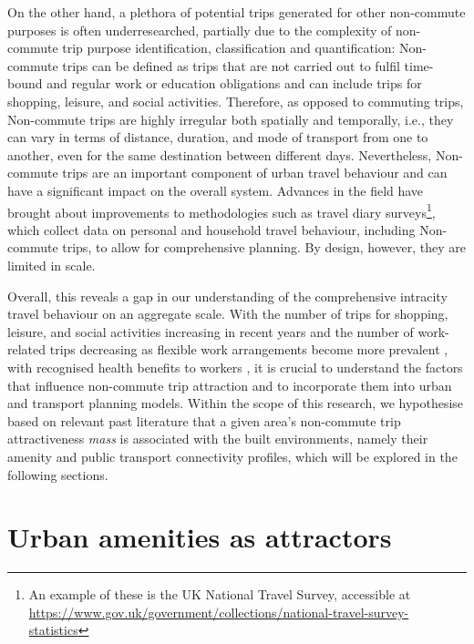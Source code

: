 On the other hand, a plethora of potential trips generated for other non-commute purposes is often underresearched, partially due to the complexity of non-commute trip purpose identification, classification and quantification: Non-commute trips can be defined as trips that are not carried out to fulfil time-bound and regular work or education obligations and can include trips for shopping, leisure, and social activities. Therefore, as opposed to commuting trips, Non-commute trips are highly irregular both spatially and temporally, i.e., they can vary in terms of distance, duration, and mode of transport from one to another, even for the same destination between different days. Nevertheless, Non-commute trips are an important component of urban travel behaviour and can have a significant impact on the overall system. Advances in the field have brought about improvements to methodologies such as travel diary surveys\footnote{An example of these is the UK National Travel Survey, accessible at \url{https://www.gov.uk/government/collections/national-travel-survey-statistics}}, which collect data on personal and household travel behaviour, including Non-commute trips, to allow for comprehensive planning. By design, however, they are limited in scale.

Overall, this reveals a gap in our understanding of the comprehensive intracity travel behaviour on an aggregate scale. With the number of trips for shopping, leisure, and social activities increasing in recent years and the number of work-related trips decreasing as flexible work arrangements become more prevalent \citep{wohnerWorkFlexiblyTravel2022}, with recognised health benefits to workers \citep{macleodCommutingWorkPostpandemic2022}, it is crucial to understand the factors that influence non-commute trip attraction and to incorporate them into urban and transport planning models. Within the scope of this research, we hypothesise based on relevant past literature that a given area's non-commute trip attractiveness \textit{mass} is associated with the built environments, namely their amenity and public transport connectivity profiles, which will be explored in the following sections.

\section{Urban amenities as attractors}

